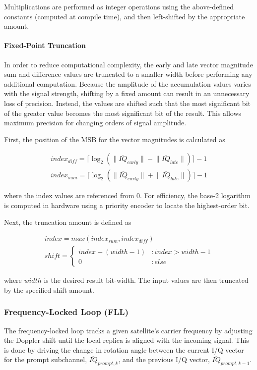 \documentclass[12pt]{article}
\begin{document}
Multiplications are performed as integer operations using the above-defined constants (computed at compile time), and then left-shifted by the appropriate amount.

\paragraph{Fixed-Point Truncation}
\label{sec:fixed-point truncation}
In order to reduce computational complexity, the early and late vector magnitude sum and difference values are truncated to a smaller width before performing any additional computation. Because the amplitude of the accumulation values varies with the signal strength, shifting by a fixed amount can result in an unnecessary loss of precision. Instead, the values are shifted such that the most significant bit of the greater value becomes the most significant bit of the result. This allows maximum precision for changing orders of signal amplitude.

First, the position of the MSB for the vector magnitudes is calculated as

\begin{gather*}
index_{diff}=\lceil \log_2(\lVert \overline{IQ}_{early} \rVert - \lVert \overline{IQ}_{late} \rVert) \rceil - 1 \\
index_{sum}=\lceil \log_2(\lVert \overline{IQ}_{early} \rVert + \lVert \overline{IQ}_{late} \rVert) \rceil - 1
\end{gather*}

where the index values are referenced from 0. For efficiency, the base-2 logarithm is computed in hardware using a priority encoder to locate the highest-order bit.

Next, the truncation amount is defined as

\begin{gather*}
index=max(index_{sum},index_{diff}) \\
shift=\begin{cases} index-(width-1) & : index>width-1 \\
                                   0 & : else \end{cases}
\end{gather*}

where $width$ is the desired result bit-width. The input values are then truncated by the specified shift amount.

\subsubsection{Frequency-Locked Loop (FLL)}
\label{sec:fll}
The frequency-locked loop tracks a given satellite's carrier frequency by adjusting the Doppler shift until the local replica is aligned with the incoming signal. This is done by driving the change in rotation angle between the current I/Q vector for the prompt subchannel, $\overline{IQ}_{prompt,k}$, and the previous I/Q vector, $\overline{IQ}_{prompt,k-1}$.
\end{document}
